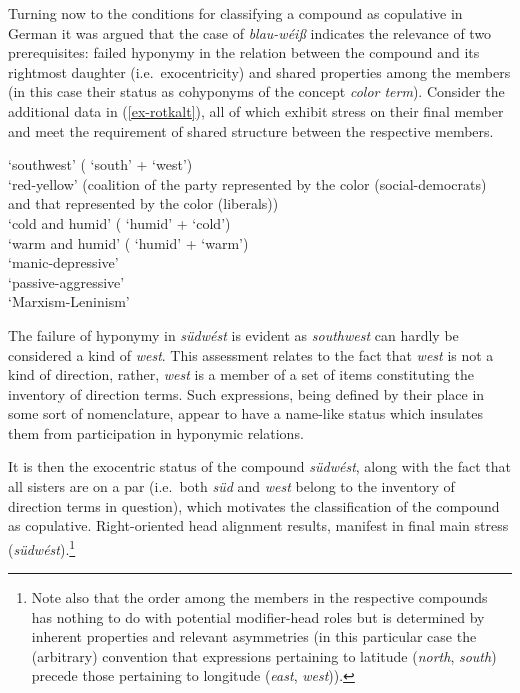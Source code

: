 \documentclass[output=paper
 ,nobabel
 ,draftmode
 ,colorlinks, citecolor=brown
]{langscibook}
\begin{document}
Turning now to the conditions for classifying a compound as copulative in German it was argued that the case of \emph{blau-wéiß}
indicates the relevance of two prerequisites: failed hyponymy in the relation between the compound and its rightmost daughter (i.e.\ exocentricity) and shared properties among the members (in this case their status as cohyponyms of the concept \emph{color term}). Consider the additional data in (\ref{ex-rotkalt}), all of which exhibit stress on their final member and meet the requirement of shared structure between the respective members. 


\eal\label{ex-rotkalt}

\ex\label{ex-südwest}
 `southwest' ( `south' +  `west') \\

\ex\label{ex-rotgelb}
 `red-yellow' (coalition of the party represented by the color  (social-democrats) and that represented by the color  (liberals))\\

\ex\label{ex-feuchtkalt}
 `cold and humid' ( `humid' +  `cold') \\ 
 `warm and humid' ( `humid' +  `warm') \\ 

\ex\label{ex-manisch}
 `manic-depressive' \\
 `passive-aggressive' \\ 

\ex\label{ex-Marxismus}
 `Marxism-Leninism' \\

\zl

\noindent
The failure of hyponymy in \emph{südwést} is evident as \emph{southwest} can hardly be considered a kind of \emph{west}. This assessment relates to the fact that \emph{west} is not a kind of direction, rather, \emph{west} is a member of a set of items constituting the inventory of direction terms. Such expressions, being defined by their place in some sort of nomenclature, appear to have a name-like status which insulates them from participation in hyponymic relations. 
 
 It is then the exocentric status of the compound \emph{südwést}, along with the fact that all sisters are on a par (i.e.\ both \emph{süd} and \emph{west} belong to the inventory of direction terms in question), which motivates the classification of the compound as copulative. Right-oriented head alignment results, manifest in final main stress (\emph{südwést}).\footnote{Note also that the order among the members in the respective compounds has nothing to do with potential modifier-head roles but is determined by inherent properties and relevant asymmetries (in this particular case the (arbitrary) convention that expressions pertaining to latitude (\emph{north}, \emph{south}) precede those pertaining to longitude (\emph{east}, \emph{west})).}
\end{document}
